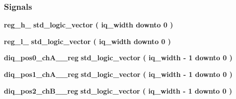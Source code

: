 \subsubsection*{Signals}
 \begin{DoxyCompactItemize}
\item 
{\bf reg\+\_\+h\+\_} {\bfseries \textcolor{comment}{std\+\_\+logic\+\_\+vector}\textcolor{vhdlchar}{ }\textcolor{vhdlchar}{(}\textcolor{vhdlchar}{ }\textcolor{vhdlchar}{ }\textcolor{vhdlchar}{ }\textcolor{vhdlchar}{ }{\bfseries {\bf iq\+\_\+width}} \textcolor{vhdlchar}{ }\textcolor{keywordflow}{downto}\textcolor{vhdlchar}{ }\textcolor{vhdlchar}{ } \textcolor{vhdldigit}{0} \textcolor{vhdlchar}{ }\textcolor{vhdlchar}{)}\textcolor{vhdlchar}{ }} 
\item 
{\bf reg\+\_\+l\+\_} {\bfseries \textcolor{comment}{std\+\_\+logic\+\_\+vector}\textcolor{vhdlchar}{ }\textcolor{vhdlchar}{(}\textcolor{vhdlchar}{ }\textcolor{vhdlchar}{ }\textcolor{vhdlchar}{ }\textcolor{vhdlchar}{ }{\bfseries {\bf iq\+\_\+width}} \textcolor{vhdlchar}{ }\textcolor{keywordflow}{downto}\textcolor{vhdlchar}{ }\textcolor{vhdlchar}{ } \textcolor{vhdldigit}{0} \textcolor{vhdlchar}{ }\textcolor{vhdlchar}{)}\textcolor{vhdlchar}{ }} 
\item 
{\bf diq\+\_\+pos0\+\_\+ch\+A\+\_\+\_\+reg} {\bfseries \textcolor{comment}{std\+\_\+logic\+\_\+vector}\textcolor{vhdlchar}{ }\textcolor{vhdlchar}{(}\textcolor{vhdlchar}{ }\textcolor{vhdlchar}{ }\textcolor{vhdlchar}{ }\textcolor{vhdlchar}{ }{\bfseries {\bf iq\+\_\+width}} \textcolor{vhdlchar}{-\/}\textcolor{vhdlchar}{ } \textcolor{vhdldigit}{1} \textcolor{vhdlchar}{ }\textcolor{keywordflow}{downto}\textcolor{vhdlchar}{ }\textcolor{vhdlchar}{ } \textcolor{vhdldigit}{0} \textcolor{vhdlchar}{ }\textcolor{vhdlchar}{)}\textcolor{vhdlchar}{ }} 
\item 
{\bf diq\+\_\+pos1\+\_\+ch\+A\+\_\+\_\+reg} {\bfseries \textcolor{comment}{std\+\_\+logic\+\_\+vector}\textcolor{vhdlchar}{ }\textcolor{vhdlchar}{(}\textcolor{vhdlchar}{ }\textcolor{vhdlchar}{ }\textcolor{vhdlchar}{ }\textcolor{vhdlchar}{ }{\bfseries {\bf iq\+\_\+width}} \textcolor{vhdlchar}{-\/}\textcolor{vhdlchar}{ } \textcolor{vhdldigit}{1} \textcolor{vhdlchar}{ }\textcolor{keywordflow}{downto}\textcolor{vhdlchar}{ }\textcolor{vhdlchar}{ } \textcolor{vhdldigit}{0} \textcolor{vhdlchar}{ }\textcolor{vhdlchar}{)}\textcolor{vhdlchar}{ }} 
\item 
{\bf diq\+\_\+pos2\+\_\+ch\+B\+\_\+\_\+reg} {\bfseries \textcolor{comment}{std\+\_\+logic\+\_\+vector}\textcolor{vhdlchar}{ }\textcolor{vhdlchar}{(}\textcolor{vhdlchar}{ }\textcolor{vhdlchar}{ }\textcolor{vhdlchar}{ }\textcolor{vhdlchar}{ }{\bfseries {\bf iq\+\_\+width}} \textcolor{vhdlchar}{-\/}\textcolor{vhdlchar}{ } \textcolor{vhdldigit}{1} \textcolor{vhdlchar}{ }\textcolor{keywordflow}{downto}\textcolor{vhdlchar}{ }\textcolor{vhdlchar}{ } \textcolor{vhdldigit}{0} \textcolor{vhdlchar}{ }\textcolor{vhdlchar}{)}\textcolor{vhdlchar}{ }} 

\end{DoxyCompactItemize}
